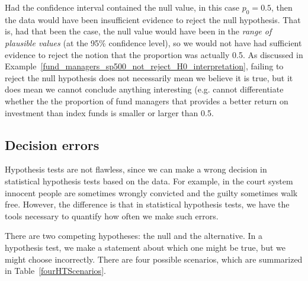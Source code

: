 Had the confidence interval contained the null value,
in this case $p_0 = 0.5$, then the data would have been
insufficient evidence to reject the null hypothesis.
That is, had that been the case, the null value would
have been in the \emph{range of plausible values}
(at the 95\% confidence level), so we would not have
had sufficient evidence to reject the notion that the
proportion was actually 0.5.
As discussed in
Example~\ref{fund_managers_sp500_not_reject_H0_interpretation},
failing to reject the
null hypothesis does not necessarily mean we believe
it is true, but it does mean we cannot conclude anything
interesting (e.g. cannot differentiate whether the
the proportion of fund managers that provides a better
return on investment than index funds is smaller or
larger than 0.5.





\subsection{Decision errors}


Hypothesis tests are not flawless, since we can make a wrong decision in statistical hypothesis tests based on the data. For example, in the court system innocent people are sometimes wrongly convicted and the guilty sometimes walk free. However, the difference is that in statistical hypothesis tests, we have the tools necessary to quantify how often we make such errors.


There are two competing hypotheses: the null and the alternative. In a hypothesis test, we make a statement about which one might be true, but we might choose incorrectly. There are four possible scenarios, which are summarized in Table~\ref{fourHTScenarios}.

